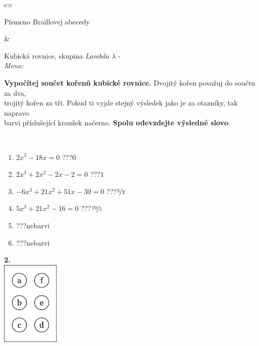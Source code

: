 \documentclass[10pt]{report}
\begin{document}
\begin{tabular}{c:c}
\begin{minipage}[c][104.5mm][t]{0.5\linewidth}
\begin{center}
\begin{minipage}{0.20\linewidth}
\begin{center}
{\small Písmeno Braillovej abecedy}
\end{center}
\end{minipage}
\end{center}
\end{minipage}
&
\begin{minipage}[c][104.5mm][t]{0.5\linewidth}
\begin{center}
\vspace{7mm}
{\huge Kubická rovnice, skupina \textit{Lambda $\lambda$} -}\\[5mm]
\textit{Meno:}\phantom{xxxxxxxxxxxxxxxxxxxxxxxxxxxxxxxxxxxxxxxxxxxxxxxxxxxxxxxxxxxxxxxxx}\\[5mm]
\begin{minipage}{0.95\linewidth}
\textbf{Vypočítej součet kořenů kubické rovnice.} Dvojitý kořen považuj do součtu za dva,\\trojitý kořen za tři. Pokud ti vyjde stejný výsledek jako je za otazníky, tak napravo\\barvi příslušející kroužek načerno. \textbf{Spolu odevzdejte výsledné slovo}.
\end{minipage}
\\[1mm]
\begin{minipage}{0.79\linewidth}
\begin{center}
\begin{varwidth}{\linewidth}
\begin{enumerate}
\Large
\item $2x^3-18x=0$\quad \dotfill\; ???\;\dotfill \quad $0$
\item $2x^3+2x^2-2x-2=0$\quad \dotfill\; ???\;\dotfill \quad $1$
\item $-6x^3+21x^2+51x-30=0$\quad \dotfill\; ???\;\dotfill \quad $\nicefrac{5}{2}$
\item $5x^3+21x^2-16=0$\quad \dotfill\; ???\;\dotfill \quad $\nicefrac{19}{5}$
\item \quad \dotfill\; ???\;\dotfill \quad nebarvi
\item \quad \dotfill\; ???\;\dotfill \quad nebarvi
\end{enumerate}
\end{varwidth}
\end{center}
\end{minipage}
\begin{minipage}{0.20\linewidth}
\begin{center}
{\Huge\bfseries 2.} \\[2mm]
\includegraphics[height=40mm]{../images/braille.png}

\end{center}
\end{minipage}
\end{center}
\end{minipage}
\end{tabular}
\end{document}

